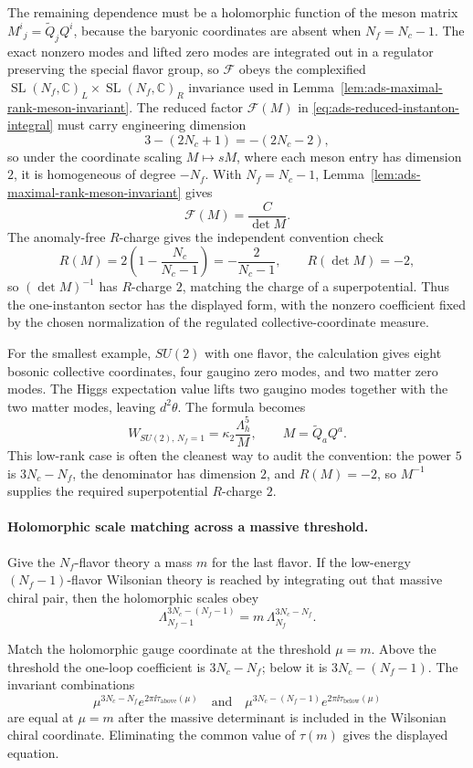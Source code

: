 The remaining dependence must be a holomorphic function of the meson matrix
\(M^i{}_j=\widetilde Q_jQ^i\), because the baryonic coordinates are absent
when \(N_f=N_c-1\).  The exact nonzero modes and lifted zero modes are
integrated out in a regulator preserving the special flavor group, so
\(\mathcal F\) obeys the complexified
\(\operatorname{SL}(N_f,\mathbb C)_L\times
\operatorname{SL}(N_f,\mathbb C)_R\) invariance used in
Lemma~\ref{lem:ads-maximal-rank-meson-invariant}.  The reduced factor
\(\mathcal F(M)\) in \eqref{eq:ads-reduced-instanton-integral} must carry
engineering dimension
\[
  3-(2N_c+1)=-(2N_c-2),
\]
so under the coordinate scaling \(M\mapsto sM\), where each meson entry has
dimension \(2\), it is homogeneous of degree \(-N_f\).  With \(N_f=N_c-1\),
Lemma~\ref{lem:ads-maximal-rank-meson-invariant} gives
\[
  \mathcal F(M)=\frac{C}{\det M}.
\]
The anomaly-free \(R\)-charge gives the independent convention check
\[
  R(M)=2\left(1-\frac{N_c}{N_c-1}\right)=-\frac{2}{N_c-1},
  \qquad
  R(\det M)=-2,
\]
so \((\det M)^{-1}\) has \(R\)-charge \(2\), matching the charge of a
superpotential.  Thus the one-instanton sector has the displayed form, with
the nonzero coefficient fixed by the chosen normalization of the regulated
collective-coordinate measure.

For the smallest example, \(SU(2)\) with one flavor, the calculation gives
eight bosonic collective coordinates, four gaugino zero modes, and two matter
zero modes.  The Higgs expectation value lifts two gaugino modes together
with the two matter modes, leaving \(d^2\theta\).  The formula becomes
\[
  W_{SU(2),\,N_f=1}
  =
  \kappa_2\frac{\Lambda_h^5}{M},
  \qquad M=\widetilde Q_aQ^a .
\]
This low-rank case is often the cleanest way to audit the convention: the
power \(5\) is \(3N_c-N_f\), the denominator has dimension \(2\), and
\(R(M)=-2\), so \(M^{-1}\) supplies the required superpotential
\(R\)-charge \(2\).

\paragraph{Holomorphic scale matching across a massive threshold.}
Give the \(N_f\)-flavor theory a mass \(m\) for the last flavor.  If the
low-energy \((N_f-1)\)-flavor Wilsonian theory is reached by integrating out
that massive chiral pair, then the holomorphic scales obey
\[
  \Lambda_{N_f-1}^{3N_c-(N_f-1)}
  =
  m\,\Lambda_{N_f}^{3N_c-N_f}.
\]

Match the holomorphic gauge coordinate at the threshold \(\mu=m\).  Above the
threshold the one-loop coefficient is \(3N_c-N_f\); below it is
\(3N_c-(N_f-1)\).  The invariant combinations
\[
  \mu^{3N_c-N_f}e^{2\pi\ii\tau_{\mathrm{above}}(\mu)}
  \quad\text{and}\quad
  \mu^{3N_c-(N_f-1)}e^{2\pi\ii\tau_{\mathrm{below}}(\mu)}
  \]
are equal at \(\mu=m\) after the massive determinant is included in the
Wilsonian chiral coordinate.  Eliminating the common value of \(\tau(m)\)
gives the displayed equation.

